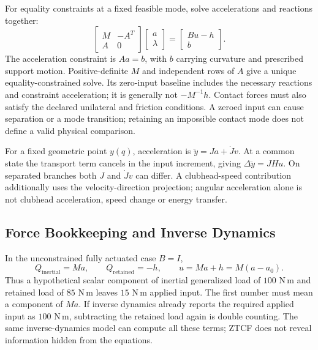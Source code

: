 For equality constraints at a fixed feasible mode, solve accelerations and reactions together:
\begin{equation}
\begin{bmatrix}M&-A^T\\A&0\end{bmatrix}
\begin{bmatrix}a\\\lambda\end{bmatrix}
=\begin{bmatrix}Bu-h\\b\end{bmatrix}.
\end{equation}
The acceleration constraint is $Aa=b$, with $b$ carrying curvature and prescribed support motion. Positive-definite $M$ and independent rows of $A$ give a unique equality-constrained solve. Its zero-input baseline includes the necessary reactions and constraint acceleration; it is generally not $-M^{-1}h$. Contact forces must also satisfy the declared unilateral and friction conditions. A zeroed input can cause separation or a mode transition; retaining an impossible contact mode does not define a valid physical comparison.

For a fixed geometric point $y(q)$, acceleration is $\ddot y=Ja+\dot Jv$. At a common state the transport term cancels in the input increment, giving $\Delta\ddot y=JHu$. On separated branches both $J$ and $\dot Jv$ can differ. A clubhead-speed contribution additionally uses the velocity-direction projection; angular acceleration alone is not clubhead acceleration, speed change or energy transfer.

\subsection{Force Bookkeeping and Inverse Dynamics}

In the unconstrained fully actuated case $B=I$,
\begin{equation}
Q_{\mathrm{inertial}}=Ma,\qquad Q_{\mathrm{retained}}=-h,
\qquad u=Ma+h=M(a-a_0).
\end{equation}
Thus a hypothetical scalar component of inertial generalized load of $100$ N\,m and retained load of $85$ N\,m leaves $15$ N\,m applied input. The first number must mean a component of $Ma$. If inverse dynamics already reports the required applied input as $100$ N\,m, subtracting the retained load again is double counting. The same inverse-dynamics model can compute all these terms; ZTCF does not reveal information hidden from the equations.

